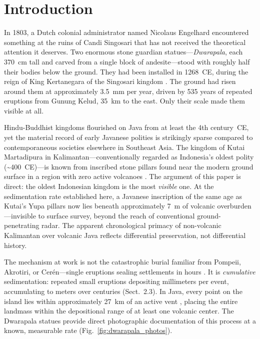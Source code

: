 \documentclass[12pt,a4paper]{article}
\begin{document}
\section{Introduction}

In 1803, a Dutch colonial administrator named Nicolaus Engelhard encountered something at the ruins of Candi Singosari that has not received the theoretical attention it deserves. Two enormous stone guardian statues---\textit{Dwarapala}, each 370~cm tall and carved from a single block of andesite---stood with roughly half their bodies below the ground. They had been installed in 1268~CE, during the reign of King Kertanegara of the Singosari kingdom \citep{kinney2003}. The ground had risen around them at approximately 3.5~mm per year, driven by 535 years of repeated eruptions from Gunung Kelud, 35~km to the east. Only their scale made them visible at all.

Hindu-Buddhist kingdoms flourished on Java from at least the 4th century~CE, yet the material record of early Javanese polities is strikingly sparse compared to contemporaneous societies elsewhere in Southeast Asia. The kingdom of Kutai Martadipura in Kalimantan---conventionally regarded as Indonesia's oldest polity (\textasciitilde400~CE)---is known from inscribed stone pillars found near the modern ground surface in a region with zero active volcanoes \citep{vogel1918,coedes1968}. The argument of this paper is direct: the oldest Indonesian kingdom is the most \textit{visible} one. At the sedimentation rate established here, a Javanese inscription of the same age as Kutai's Yupa pillars now lies beneath approximately 7~m of volcanic overburden---invisible to surface survey, beyond the reach of conventional ground-penetrating radar. The apparent chronological primacy of non-volcanic Kalimantan over volcanic Java reflects differential preservation, not differential history.

The mechanism at work is not the catastrophic burial familiar from Pompeii, Akrotiri, or Cer\'{e}n---single eruptions sealing settlements in hours \citep{sigurdsson1985,doumas1983,sheets1992}. It is \textit{cumulative} sedimentation: repeated small eruptions depositing millimeters per event, accumulating to meters over centuries (Sect.~2.3). In Java, every point on the island lies within approximately 27~km of an active vent \citep{vanbemmelen1949}, placing the entire landmass within the depositional range of at least one volcanic center. The Dwarapala statues provide direct photographic documentation of this process at a known, measurable rate (Fig.~\ref{fig:dwarapala_photos}).
\end{document}
